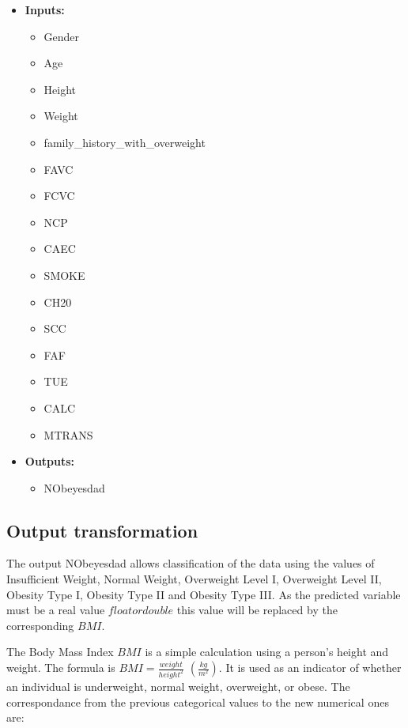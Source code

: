 \documentclass[11pt, a4paper]{article}
\begin{document}
\begin{itemize}
    \item \textbf{Inputs:}
    \begin{itemize}
        \item Gender
        \item Age
        \item Height
        \item Weight
        \item family\_history\_with\_overweight
        \item FAVC
        \item FCVC
        \item NCP
        \item CAEC
        \item SMOKE
        \item CH20
        \item SCC
        \item FAF
        \item TUE
        \item CALC
        \item MTRANS
    \end{itemize}
    \item \textbf{Outputs:}
    \begin{itemize}
        \item NObeyesdad
    \end{itemize}
\end{itemize}

\subsection{Output transformation}

The output NObeyesdad allows classification of the data using the values of Insufficient Weight, Normal Weight, Overweight Level I, 
Overweight Level II, Obesity Type I, Obesity Type II and Obesity Type III. As the predicted variable must be a real value \(float or double\) 
this value will be replaced by the corresponding \(BMI\).

\vspace{1em}The Body Mass Index \(BMI\) is a simple calculation using a person's height and weight. The formula is \(BMI = \frac{weight}{height^{2}}\) 
\((\frac{kg}{m^{2}})\). It is used as an indicator of whether an individual is underweight, normal weight, overweight, or obese. The correspondance from the 
previous  categorical values to the new numerical ones are:
\end{document}
